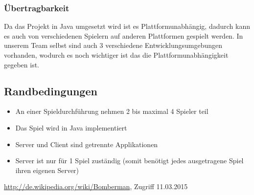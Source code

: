 \documentclass[11pt]{scrartcl}
\begin{document}
\subsubsection{Übertragbarkeit}
\label{sec:Übertragbarkeit}
Da das Projekt in Java umgesetzt wird ist es Plattformunabhängig, dadurch kann es auch von verschiedenen Spielern auf anderen Plattformen gespielt werden.
In unserem Team selbst sind auch 3 verschiedene Entwicklungsumgebungen vorhanden, wodurch es noch wichtiger ist das die Plattformunabhängigkeit gegeben ist.

\subsection{Randbedingungen}
\label{sec:Randbedingungen}
\begin{itemize}
    \item An einer Spieldurchführung nehmen 2 bis maximal 4 Spieler teil
    \item Das Spiel wird in Java implementiert
    \item Server und Client sind getrennte Applikationen
    \item Server ist nur für 1 Spiel zuständig (somit benötigt jedes ausgetragene Spiel ihren eigenen Server)
\end{itemize}


\begin{thebibliography}{999}
\url{http://de.wikipedia.org/wiki/Bomberman}, Zugriff 
11.03.2015
\end{thebibliography}
\end{document}
